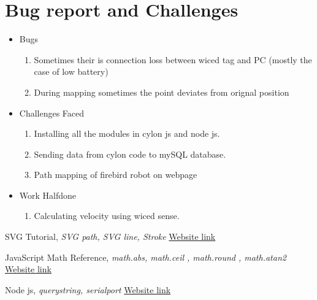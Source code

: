 \documentclass[a4paper,12pt,oneside]{book}
\begin{document}
\section{Bug report and Challenges}
\begin{itemize}
\item{Bugs}
\begin{enumerate}
    \item{Sometimes their is connection loss between wiced tag and PC (mostly the case of low battery)}
    \item{During mapping sometimes the point deviates from orignal position}
\end{enumerate}
\item{Challenges Faced}
\begin{enumerate}
    \item{Installing all the modules in cylon js and node js.}
    \item{Sending data from cylon code to mySQL database.}
    \item{Path mapping of firebird robot on webpage}
\end{enumerate}
\item{Work Halfdone}
\begin{enumerate}
    \item{Calculating velocity using wiced sense.}
\end{enumerate}
\end{itemize}


\newpage
\begin{thebibliography}{li}

SVG Tutorial, {\em SVG path, SVG line, Stroke}  
\href{http://www.w3schools.com/svg/}{Website link}

JavaScript Math Reference, {\em math.abs, math.ceil , math.round , math.atan2}  
\href{http://www.w3schools.com/jsref/jsref_obj_math.asp}{Website link}

Node js, {\em querystring, serialport}  
\href{https://nodejs.org/}{Website link}



\end{thebibliography}
\end{document}

